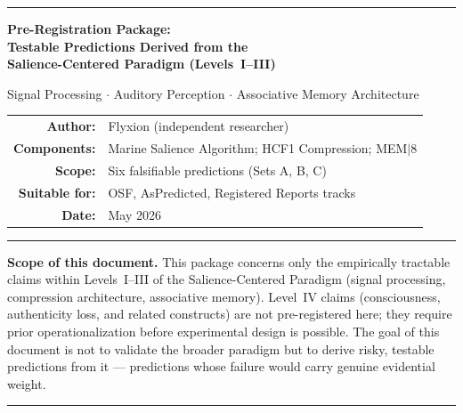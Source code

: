 \documentclass[11pt, a4paper]{article}
\newcommand{\mem}{MEM$|$8}
\newcommand{\hcf}{HCF1}
\newcommand{\scp}{Salience-Centered Paradigm}
\begin{document}
\raggedbottom

\begin{titlepage}
\vspace*{1.0cm}
{\color{navy}\rule{\linewidth}{1.5pt}}
\vspace{0.4cm}

\begin{center}
{\LARGE\bfseries\color{navy}
Pre-Registration Package:\\[0.45em]
Testable Predictions Derived from the\\[0.45em]
Salience-Centered Paradigm (Levels~I–III)
}

\vspace{0.6cm}
{\large\color{steel}
Signal Processing $\cdot$ Auditory Perception $\cdot$ Associative Memory Architecture
}

\vspace{1.0cm}
\begin{tabular}{rl}
\textbf{Author:}       & Flyxion (independent researcher) \\[4pt]
\textbf{Components:}   & Marine Salience Algorithm; \hcf{} Compression; \mem{} \\[4pt]
\textbf{Scope:}        & Six falsifiable predictions (Sets A, B, C) \\[4pt]
\textbf{Suitable for:} & OSF, AsPredicted, Registered Reports tracks \\[4pt]
\textbf{Date:}         & May 2026
\end{tabular}

\vspace{1.0cm}
{\color{navy}\rule{\linewidth}{0.7pt}}
\vspace{0.4cm}

\begin{notebox}
\textbf{Scope of this document.}
This package concerns only the empirically tractable claims within Levels~I–III
of the \scp{} (signal processing, compression architecture, associative memory).
Level~IV claims (consciousness, authenticity loss, and related constructs) are not
pre-registered here; they require prior operationalization before experimental
design is possible.  The goal of this document is not to validate the broader
paradigm but to derive risky, testable predictions from it — predictions whose
failure would carry genuine evidential weight.
\end{notebox}

\end{center}
\vfill
{\color{navy}\rule{\linewidth}{1.5pt}}
\end{titlepage}
\end{document}
